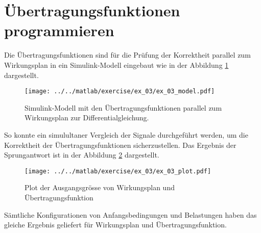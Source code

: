 \section{Übertragungsfunktionen programmieren}

Die Übertragungsfunktionen sind für die Prüfung der Korrektheit
parallel zum Wirkungsplan in ein Simulink-Modell eingebaut wie in der
Abbildung \ref{fig:ex_03_model} dargestellt.

\begin{figure}[h!]
	\centering
	\texttt{[image: ../../matlab/exercise/ex\_03/ex\_03\_model.pdf]}
	\caption{Simulink-Modell mit den Übertragungsfunktionen parallel zum 
		Wirkungsplan zur Differentialgleichung.}
	\label{fig:ex_03_model}
\end{figure}

So konnte ein simulultaner Vergleich der Signale durchgeführt werden, um
die Korrektheit der Übertragungsfunktionen sicherzustellen. Das Ergebnis
der Sprungantwort ist in der Abbildung \ref{fig:ex_03_plot} dargestellt.

\begin{figure}[h!]
	\centering
	\texttt{[image: ../../matlab/exercise/ex\_03/ex\_03\_plot.pdf]}
	\caption{Plot der Ausgangsgrösse von Wirkungsplan und
		Übertragungsfunktion}
	\label{fig:ex_03_plot}
\end{figure}

Sämtliche Konfigurationen von Anfangsbedingungen und Belastungen haben das
gleiche Ergebnis geliefert für Wirkungsplan und Übertragungsfunktion.
